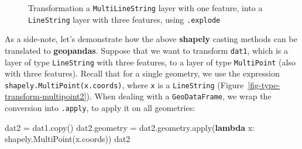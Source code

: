 \documentclass[
  letterpaper,
]{krantz}
\newenvironment{Shaded}{\begin{snugshade}}{\end{snugshade}}
\newcommand{\BuiltInTok}[1]{\textcolor[rgb]{0.00,0.23,0.31}{#1}}
\newcommand{\KeywordTok}[1]{\textcolor[rgb]{0.00,0.23,0.31}{\textbf{#1}}}
\newcommand{\NormalTok}[1]{\textcolor[rgb]{0.00,0.23,0.31}{#1}}
\newcommand{\OperatorTok}[1]{\textcolor[rgb]{0.37,0.37,0.37}{#1}}
\begin{document}
\begin{figure}

\begin{minipage}{0.50\linewidth}



\end{minipage}%
%
\begin{minipage}{0.50\linewidth}



\end{minipage}%

\caption{\label{fig-multilinestring-to-linestring}Transformation a
\texttt{\textquotesingle{}MultiLineString\textquotesingle{}} layer with
one feature, into a
\texttt{\textquotesingle{}LineString\textquotesingle{}} layer with three
features, using \texttt{.explode}}

\end{figure}%

As a side-note, let's demonstrate how the above \textbf{shapely} casting
methods can be translated to \textbf{geopandas}. Suppose that we want to
transform \texttt{dat1}, which is a layer of type
\texttt{\textquotesingle{}LineString\textquotesingle{}} with three
features, to a layer of type
\texttt{\textquotesingle{}MultiPoint\textquotesingle{}} (also with three
features). Recall that for a single geometry, we use the expression
\texttt{shapely.MultiPoint(x.coords)}, where \texttt{x} is a
\texttt{\textquotesingle{}LineString\textquotesingle{}}
(Figure~\ref{fig-type-transform-multipoint2}). When dealing with a
\texttt{GeoDataFrame}, we wrap the conversion into \texttt{.apply}, to
apply it on all geometries:

\begin{Shaded}
\begin{Highlighting}[]
\NormalTok{dat2 }\OperatorTok{=}\NormalTok{ dat1.copy()}
\NormalTok{dat2.geometry }\OperatorTok{=}\NormalTok{ dat2.geometry.}\BuiltInTok{apply}\NormalTok{(}\KeywordTok{lambda}\NormalTok{ x: shapely.MultiPoint(x.coords))}
\NormalTok{dat2}
\end{Highlighting}
\end{Shaded}
\end{document}
